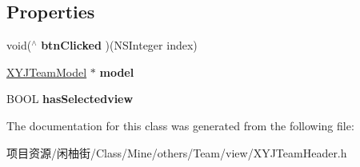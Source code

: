 \subsection*{Properties}
\begin{DoxyCompactItemize}
\item 
\mbox{\label{interface_x_y_j_team_header_afdd791e311252dc4e5db8396749d43c3}} 
void($^\wedge$ {\bfseries btn\+Clicked} )(N\+S\+Integer index)
\item 
\mbox{\label{interface_x_y_j_team_header_a69fcdd450087224e220b45b93ed532d5}} 
\mbox{\hyperlink{interface_x_y_j_team_model}{X\+Y\+J\+Team\+Model}} $\ast$ {\bfseries model}
\item 
\mbox{\label{interface_x_y_j_team_header_a02f62fe8822fc3ebb725629af3d88b37}} 
B\+O\+OL {\bfseries has\+Selectedview}
\end{DoxyCompactItemize}


The documentation for this class was generated from the following file\+:\begin{DoxyCompactItemize}
\item 
项目资源/闲柚街/\+Class/\+Mine/others/\+Team/view/X\+Y\+J\+Team\+Header.\+h\end{DoxyCompactItemize}
